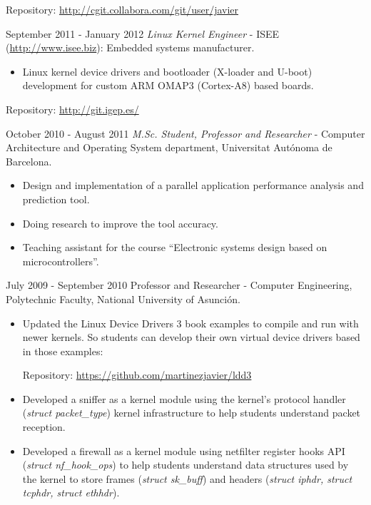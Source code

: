 \documentclass{simplecv}
\begin{document}
\begin{topic}
Repository: \url{http://cgit.collabora.com/git/user/javier}

\item[September 2011 - January 2012] \emph{Linux Kernel Engineer} - ISEE (\url{http://www.isee.biz}): Embedded systems manufacturer.

\begin{itemize}

\item Linux kernel device drivers and bootloader (X-loader and U-boot) development for custom ARM OMAP3 (Cortex-A8) based boards.

\end{itemize}

Repository: \url{http://git.igep.es/}

\item[October 2010 - August 2011] \emph{M.Sc. Student, Professor and Researcher} - Computer Architecture and Operating System department, Universitat Autónoma de Barcelona.

\begin{itemize}

\item Design and implementation of a parallel application performance analysis and prediction tool.

\item Doing research to improve the tool accuracy.

\item Teaching assistant for the course ``Electronic systems design based on microcontrollers''.

\end{itemize}

\item[July 2009 - September 2010] Professor and Researcher  - Computer Engineering, Polytechnic Faculty, National University of Asunción.

\begin{itemize}

\item Updated the Linux Device Drivers 3 book examples to compile and run with newer kernels. So students can develop their own virtual device drivers based in those examples:

Repository: \url{https://github.com/martinezjavier/ldd3}

\item Developed a sniffer as a kernel module using the kernel's protocol handler (\emph{struct packet\_type}) kernel infrastructure to help students understand packet reception.

\item Developed a firewall as a kernel module using netfilter register hooks API (\emph{struct nf\_hook\_ops}) to help students understand data structures used by the kernel to store frames (\emph{struct sk\_buff}) and headers (\emph{struct iphdr, struct tcphdr, struct ethhdr}).

\end{itemize}

\end{topic}
\end{document}
